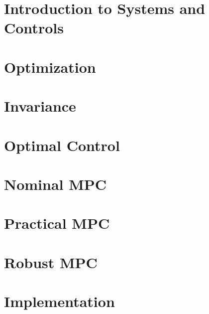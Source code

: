 \documentclass[layout=summary, columns=4,secnumdepth=2,tight]{sst-custom}
\begin{document}
\iftoggle{do-multicol}{ \begin{multicols}{\numcolumns}}{}
		
		\iftoggle{use-small-font}{\footnotesize}{}
		\renewcommand{\contentsname}{}
		\vspace{-5mm}
		\begin{spacing}{0.9}
			\tableofcontents
		\end{spacing}
		
		\section{Introduction to Systems and Controls}
		
		
		
		\section{Optimization}
		
		\section{Invariance}
		
		
		\section{Optimal Control}
		\section{Nominal MPC}
		
		\section{Practical MPC}
		
		\section{Robust MPC}
		
		\section{Implementation}
		
		\iftoggle{do-multicol}{\end{multicols}}{}
\end{document}
